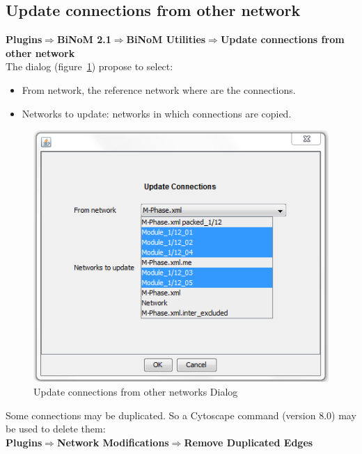 \subsection{Update connections from other network}
\textbf{Plugins$\Rightarrow$BiNoM 2.1$\Rightarrow$BiNoM Utilities$\Rightarrow$Update connections from other network}\\
The dialog (figure~\ref{Update_connections}) propose to select:
\begin{itemize}
\item From network, the reference network where are the connections.
\item Networks to update: networks in which connections are copied.
\end{itemize}
\begin{figure}[h]
\centering
\includegraphics{graphics/Update_connections}
\caption{Update connections from other networks Dialog}
\label{Update_connections}
\end{figure}
Some connections may be duplicated. So a Cytoscape command (version 8.0) may be used to delete them:\\
\textbf{Plugins$\Rightarrow$Network Modifications$\Rightarrow$Remove Duplicated Edges}

